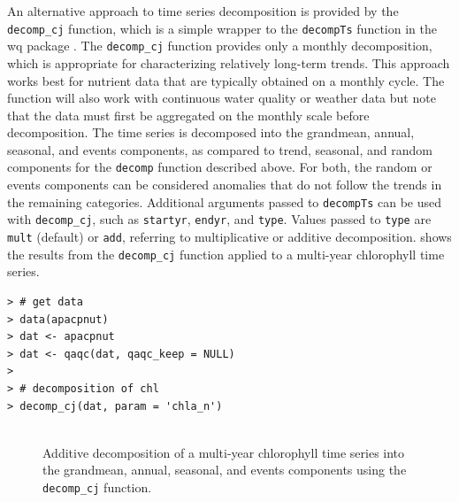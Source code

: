 \documentclass[10pt,letterpaper]{article}\usepackage[]{graphicx}\usepackage[]{color}
\makeatletter
\newenvironment{kframe}{%
 \def\at@end@of@kframe{}%
 \ifinner\ifhmode%
  \def\at@end@of@kframe{\end{minipage}}%
  \begin{minipage}{\columnwidth}%
 \fi\fi%
 \def\FrameCommand##1{\hskip\@totalleftmargin \hskip-\fboxsep
 \colorbox{shadecolor}{##1}\hskip-\fboxsep
     \hskip-\linewidth \hskip-\@totalleftmargin \hskip\columnwidth}%
 \MakeFramed {\advance\hsize-\width
   \@totalleftmargin\z@ \linewidth\hsize
   \@setminipage}}%
 {\par\unskip\endMakeFramed%
 \at@end@of@kframe}
\newenvironment{knitrout}{}{} %
\makeatother
\begin{document}
An alternative approach to time series decomposition is provided by the \texttt{decomp\_cj} function, which is a simple wrapper to the \texttt{decompTs} function in the wq package \cite{Cloern10,Jassby14}.  The \texttt{decomp\_cj} function provides only a monthly decomposition, which is appropriate for characterizing relatively long-term trends.  This approach works best for nutrient data that are typically obtained on a monthly cycle.  The function will also work with continuous water quality or weather data but note that the data must first be aggregated on the monthly scale before decomposition.  The time series is decomposed into the grandmean, annual, seasonal, and events components, as compared to trend, seasonal, and random components for the \texttt{decomp} function described above.  For both, the random or events components can be considered anomalies that do not follow the trends in the remaining categories.  Additional arguments passed to \texttt{decompTs} can be used with \texttt{decomp\_cj}, such as \texttt{startyr}, \texttt{endyr}, and \texttt{type}.  Values passed to \texttt{type} are \texttt{mult} (default) or \texttt{add}, referring to multiplicative or additive decomposition.   shows the results from the \texttt{decomp\_cj} function applied to a multi-year chlorophyll time series.

\begin{knitrout}\small
{}\color{fgcolor}\begin{kframe}
\begin{verbatim}
> # get data
> data(apacpnut)
> dat <- apacpnut
> dat <- qaqc(dat, qaqc_keep = NULL)
> 
> # decomposition of chl
> decomp_cj(dat, param = 'chla_n')
\end{verbatim}
\end{kframe}\begin{figure}[!h]

{\centering \includegraphics[width=0.00\textwidth]{figure/decomp_ex2-1} 

}

\caption[Additive decomposition of a multi-year chlorophyll time series into the grandmean, annual, seasonal, and events components using the \texttt{decomp\_cj} function]{Additive decomposition of a multi-year chlorophyll time series into the grandmean, annual, seasonal, and events components using the \texttt{decomp\_cj} function.}\label{fig:decomp_ex2}
\end{figure}


\end{knitrout}
\end{document}
